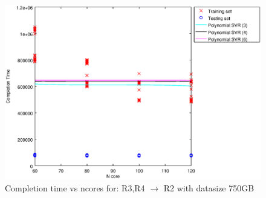 
\begin {figure}[hbtp]
\centering
\includegraphics[width=\textwidth]{output/R3_R4_VS_R2_750_ALL_FEATURES/plot_R3_R4_VS_R2_750_bestmodels.eps}
\caption{Completion time vs ncores for: R3,R4 $\rightarrow$ R2 with datasize 750GB}
\label{fig:coreonly_linear_R3,R4_R2_750}
\end {figure}
